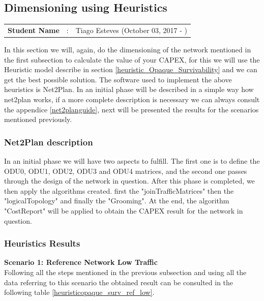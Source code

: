 \subsection{Dimensioning using Heuristics}
\begin{tcolorbox}	
\begin{tabular}{p{2.75cm} p{0.2cm} p{10.5cm}} 	
\textbf{Student Name}  &:& Tiago Esteves    (October 03, 2017 - )\\
\end{tabular}
\end{tcolorbox}

\vspace{11pt}
In this section we will, again, do the dimensioning of the network mentioned in the first subsection to calculate the value of your CAPEX, for this we will use the Heuristic model describe in section \ref{heuristic_Opaque_Survivability} and we can get the best possible solution.
The software used to implement the above heuristics is Net2Plan.
In an initial phase will be described in a simple way how net2plan works, if a more complete description is necessary we can always consult the appendice \ref{net2planguide}, next will be presented the results for the scenarios mentioned previously.

\subsubsection{Net2Plan description}

In an initial phase we will have two aspects to fulfill. The first one is to define the ODU0, ODU1, ODU2, ODU3 and ODU4 matrices, and the second one passes through the design of the network in question.
After this phase is completed, we then apply the algorithms created. first the "joinTrafficMatrices" then the "logicalTopology" and finally the "Grooming".
At the end, the algorithm "CostReport" will be applied to obtain the CAPEX result for the network in question.

\subsubsection{Heuristics Results}

\textbf{Scenario 1: Reference Network Low Traffic}\\

Following all the steps mentioned in the previous subsection and using all the data referring to this scenario the obtained result can be consulted in the following table \ref{heuristicopaque_surv_ref_low}.

